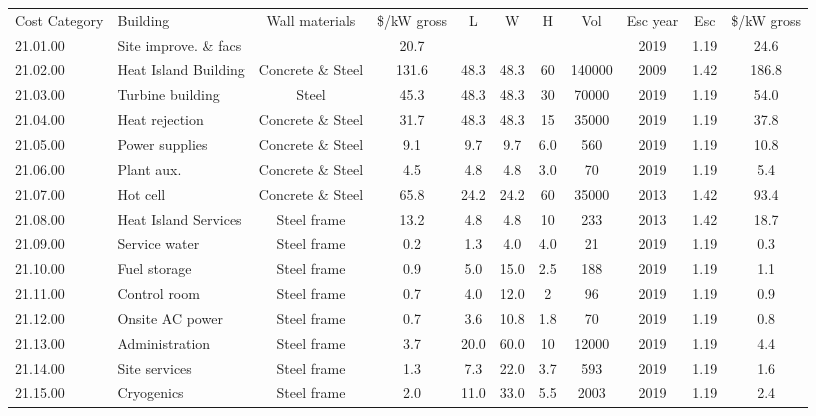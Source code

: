 \begin{table}[ht!]
    \begin{tiny}
        \centering
        \begin{tabular}{l l  c c c c c c c c c }
            Cost Category	&	Building	&	Wall materials	&	 \$/kW gross	&	L	&	W	&	H	&	Vol	&	Esc year	&	Esc	&\$/kW gross	\\
            21.01.00	&	Site improve. \& facs	&		&	20.7	&		&		&		&		&	2019	&	1.19	&	24.6	\\
            21.02.00	&	Heat Island Building	&	Concrete \& Steel	&	131.6	&	48.3	&	48.3	&	60	&	140000	&	2009	&	1.42	&	186.8	\\
            21.03.00	&	Turbine building	&	Steel 	&	45.3	&	48.3	&	48.3	&	30	&	70000	&	2019	&	1.19	&	54.0	\\
            21.04.00	&	Heat rejection 	&	Concrete \& Steel	&	31.7	&	48.3	&	48.3	&	15	&	35000	&	2019	&	1.19	&	37.8	\\
            21.05.00	&	Power supplies	&	Concrete \& Steel	&	9.1	&	9.7	&	9.7	&	6.0	&	560	&	2019	&	1.19	&	10.8	\\
            21.06.00	&	Plant aux.	&	Concrete \& Steel	&	4.5	&	4.8	&	4.8	&	3.0	&	70	&	2019	&	1.19	&	5.4	\\
            21.07.00	&	Hot cell	&	Concrete \& Steel	&	65.8	&	24.2	&	24.2	&	60	&	35000	&	2013	&	1.42	&	93.4	\\
            21.08.00	&	Heat Island Services	&	Steel frame	&	13.2	&	4.8	&	4.8	&	10	&	233	&	2013	&	1.42	&	18.7	\\
            21.09.00	&	Service water	&	Steel frame	&	0.2	&	1.3	&	4.0	&	4.0	&	21	&	2019	&	1.19	&	0.3	\\
            21.10.00	&	Fuel storage	&	Steel frame	&	0.9	&	5.0	&	15.0	&	2.5	&	188	&	2019	&	1.19	&	1.1	\\
            21.11.00	&	Control room	&	Steel frame	&	0.7	&	4.0	&	12.0	&	2	&	96	&	2019	&	1.19	&	0.9	\\
            21.12.00	&	Onsite AC power	&	Steel frame	&	0.7	&	3.6	&	10.8	&	1.8	&	70	&	2019	&	1.19	&	0.8	\\
            21.13.00	&	Administration	&	Steel frame	&	3.7	&	20.0	&	60.0	&	10	&	12000	&	2019	&	1.19	&	4.4	\\
            21.14.00	&	Site services	&	Steel frame	&	1.3	&	7.3	&	22.0	&	3.7	&	593	&	2019	&	1.19	&	1.6	\\
            21.15.00	&	Cryogenics	&	Steel frame	&	2.0	&	11.0	&	33.0	&	5.5	&	2003	&	2019	&	1.19	&	2.4	\\

\end{tabular}
\end{tiny}
\end{table}
